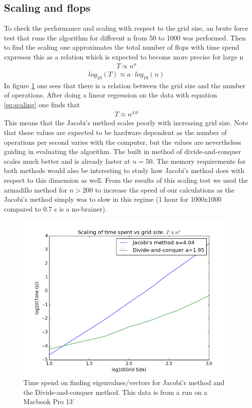 \documentclass[a4paper,11pt]{article}
\begin{document}
{\begin{figure}
\end{figure}


\subsection{Scaling and flops}
To check the performance and scaling with respect to the grid size, an brute force test that runs the algorithm for different n from 50 to 1000 was performed. Then to find the scaling one approximates the total number of flops with time spend expresses this as a relation which is expected to become more precise for large n
\begin{align}
T \propto n^{a} 
\end{align}
\begin{align}
log_{10}(T) \approx a\cdot log_{10}(n)
\label{eq:scaling}
\end{align}
In figure \ref{fig:scaling} one sees that there is a relation between the grid size and the number of operations. After doing a linear regression on the data with equation \ref{eq:scaling} one finds that 
\begin{align}
T \approx n^{4.0}
\end{align}
This means that the Jacobi's method scales poorly with increasing grid size. Note that these values are expected to be hardware dependent as the number of operations per second varies with the computer, but the values are nevertheless guiding in evaluating the algorithm. The built in method of divide-and-conquer scales much better and is already faster at $n=50$. The memory requirements for both methods would also be interesting to study how Jacobi's method does with respect to this dimension as well. From the results of this scaling test we used the armadillo method for $n>200$ to increase the speed of our calculations as the Jacobi's method simply was to slow in this regime (1 hour for 1000x1000 compared to 0.7 s is a no-brainer). 
\begin{figure}
	\centering
	\includegraphics[scale=0.5]{Project2_scaling_time}
	\caption{Time spend on finding eigenvalues/vectors for Jacobi's method and the Divide-and-conquer method.  This data is from a run on a Macbook Pro 13' }
	\label{fig:scaling}
\end{figure}




}
\end{document}
